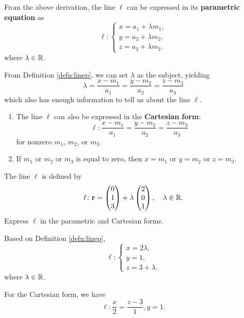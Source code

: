 \documentclass[12pt]{article}
\renewcommand{\vec}{\mathbf}
\begin{document}
\begin{defn} \label{defn:linep}
	From the above derivation, the line \(\ell\) can be expressed in its \textbf{parametric equation} as
	\[ \ell \colon 
	\begin{cases}
		x = a_1 + \lambda m_1, \\
		y = a_2 + \lambda m_2, \\
		z = a_3 + \lambda m_3.
	\end{cases}\] 
	where \(\lambda \in \mathbb{R}\).
\end{defn}
From Definition \ref{defn:linep}, we can set \(\lambda\) as the subject, yielding
\[ \lambda = \frac{x - m_1}{a_1} = \frac{y - m_2}{a_2} = \frac{z - m_3}{a_3} \] 
which also has enough information to tell us about the line \(\ell\).
\begin{defn}
	\begin{enumerate}
		\item The line \(\ell\) can also be expressed in the \textbf{Cartesian form}:
		\[ \ell \colon \frac{x - m_1}{a_1} = \frac{y - m_2}{a_2} = \frac{z - m_3}{a_3} \] 
		for nonzero \(m_1\), \(m_2\), or \(m_3\).
		\item If \(m_1\) or \(m_2\) or \(m_3\) is equal to zero, then \(x = m_1\) or \(y = m_2\) or \(z = m_3\).
	\end{enumerate}
\end{defn}

\begin{eg}
	The line \(\ell\) is defined by
	\[ \ell \colon \vec{r} = \cvec{0 \\ 1 \\ 3} + \lambda \cvec{2 \\ 0 \\ 1}, \quad \lambda \in \R. \]
	Express \(\ell\) in the parametric and Cartesian forms.
	\begin{soln}
		Based on Definition \ref{defn:linep}, 
		\[ \ell \colon 
		\begin{cases}
			x = 2 \lambda, \\
			y = 1, \\
			z = 3 + \lambda.
		\end{cases}\] 
		where \(\lambda \in \mathbb{R}\).

		For the Cartesian form, we have
		\[ \ell \colon \frac{x}{2} = \frac{z - 3}{1}, y = 1. \] 
	\end{soln}
\end{eg}
\end{document}
